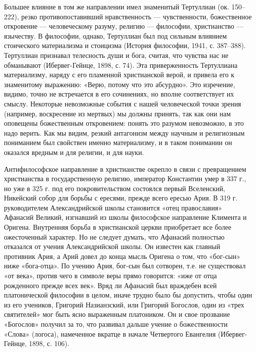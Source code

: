 Большее влияние в  том же направлении имел  знаменитый Тертуллиан (ок.
150--222), резко противопоставивший  нравственность --- чувственности,
божественное   откровение  ---   человеческому  разуму,   религию  ---
философии, христианство --- язычеству. В философии, однако, Тертуллиан
был под сильным влиянием стоического материализма и стоицизма (История
философии, 1941, с. 387--388).  Тертуллиан признавал телесность души и
бога,  считая, что  чувства нас  не обманывают  (Ибервег-Гейнце, 1898,
с.  74). Эта  приверженность  Тертуллиана материализму,  наряду с  его
пламенной христианской  верой, и привела его  к знаменитому выражению:
«Верю,  потому что  это  абсурдно». Это  изречение,  видимо, точно  не
встречается  в  его сочинениях,  но  вполне  соответствует их  смыслу.
Некоторые  невозможные  события  с  нашей  человеческой  точки  зрения
(например, воскресение из мертвых) мы  должны принять, так как они нам
оповещены божественным  откровением: понять это разумом  невозможно, в
это  надо верить.  Как мы  видим,  резкий антагонизм  между научным  и
религиозным пониманием  был свойствен  именно материализму, и  в таком
понимании он оказался вредным и для религии, и для науки.

Антифилософское  направление   в  христианстве   окрепло  в   связи  с
превращением   христианства  в   государственную  религию,   император
Константин умер  в 337 г.,  но уже в  325 г. под  его покровительством
состоялся  первый Вселенский,  Никейский собор  для борьбы  с ересями,
прежде всего ересью Ария. В 319 г. руководителем Александрийской школы
становится  «отец православия»  Афанасий Великий,  изгнавший из  школы
философское  направление  Климента  и  Оригена.  Внутренняя  борьба  в
христианской  церкви  приобретает  все  более  ожесточенный  характер.
Но  не следует  думать,  что Афанасий  полностью  отказался от  учения
Александрийской школы. Он известен как  главный противник Ария, а Арий
довел до конца мысль Оригена о том, что «бог-сын» ниже «бога-отца». По
учению  Ария, бог-сын  был сотворен,  т.е. не  существовал «от  века»,
против чего  в символе веры  прямо говорится: «иже от  отца рожденного
прежде всех  век». Вряд ли  Афанасий был враждебен  всей платонической
философии в целом,  иначе трудно было бы допустить, чтобы  один из его
учеников, Григорий  Назианзский, или Григорий Богослов,  один из «трех
святителей» мог быть  ясно выраженным платоником. Он  и свое прозвание
«Богослов» получил за то, что  развивал дальше учение о божественности
«Слова»  (логоса), намеченное  вкратце в  начале Четвертого  Евангелия
(Ибервег-Гейнце, 1898, с. 106).

